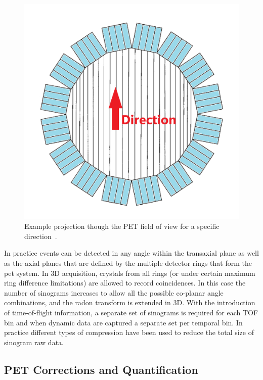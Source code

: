 \begin{itemize}
\begin{figure} [h!]
\includegraphics[scale=0.15,angle=0]{2_Theory_Methods/figures/Sinogram_detector_to_Sino.png}
\caption{Example projection though the PET field of view for a specific direction~\cite{Fahey2002}.} 
\label{fig_2:Sinogram_detector_to_Sino}
\end{figure} 
%
In practice events can be detected in any angle within the transaxial plane as well as the axial planes that are defined by the multiple detector rings that form the \gls{pet} system. In 3D acquisition, crystals from all rings (or under certain maximum ring difference limitations) are allowed to record coincidences. In this case the number of sinograms increases to allow all the possible co-planar angle combinations, and the radon transform is extended in 3D. With the introduction of time-of-flight information, a separate set of sinograms is required for each TOF bin and when dynamic data are captured a separate set per temporal bin. In practice different types of compression have been used to reduce the total size of sinogram raw data.

\end{itemize}

\subsection{PET Corrections and Quantification}

